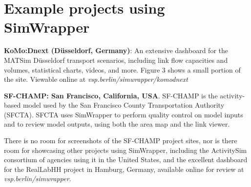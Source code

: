 \documentclass[3p,times,procedia]{elsarticle}
\begin{document}




\section{Example projects using SimWrapper}

\textbf{KoMo:Dnext (Düsseldorf, Germany)}: An extensive dashboard for the MATSim Düsseldorf transport scenarios, including link flow capacities and volumes, statistical charts, videos, and more. Figure 3 shows a small portion of the site. Viewable online at \textit{vsp.berlin/simwrapper/komodnext}

\textbf{SF-CHAMP: San Francisco, California, USA}. SF-CHAMP is the activity-based model used by the San Francisco County Transportation Authority (SFCTA)\cite{outwater2006san}. SFCTA uses SimWrapper to perform quality control on model inputs and to review model outputs, using both the area map and the link viewer.

There is no room for screenshots of the SF-CHAMP project sites, nor is there room for showcasing other projects using SimWrapper, including the ActivitySim consortium of agencies using it in the United States, and the excellent dashboard for the RealLabHH project in Hamburg, Germany, available online for review at \textit{vsp.berlin/simwrapper}.
\end{document}
